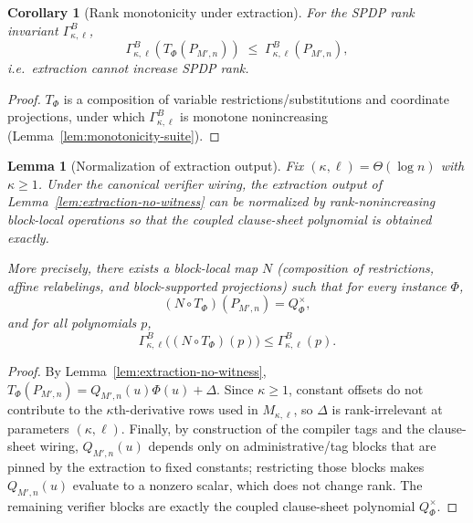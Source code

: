 \documentclass[12pt]{article}
\newtheorem{lemma}[theorem]{Lemma}
\newtheorem{corollary}[theorem]{Corollary}
\theoremstyle{definition}
\theoremstyle{definition}
\theoremstyle{remark}
\theoremstyle{remark}
\begin{document}
\begin{corollary}[Rank monotonicity under extraction]
\label{cor:rank-monotone-extraction}
For the SPDP rank invariant $\Gamma^{B}_{\kappa,\ell}$,
\[
\Gamma^{B}_{\kappa,\ell}\!\left(T_{\Phi}(P_{M',n})\right)
\;\le\;
\Gamma^{B}_{\kappa,\ell}(P_{M',n}),
\]
i.e.\ extraction cannot increase SPDP rank.
\end{corollary}

\begin{proof}
$T_{\Phi}$ is a composition of variable restrictions/substitutions and coordinate
projections, under which $\Gamma^{B}_{\kappa,\ell}$ is monotone nonincreasing
(Lemma~\ref{lem:monotonicity-suite}).
\end{proof}

\begin{lemma}[Normalization of extraction output]
\label{lem:extraction-normalization}
Fix $(\kappa,\ell)=\Theta(\log n)$ with $\kappa\ge 1$. Under the canonical verifier wiring,
the extraction output of Lemma~\ref{lem:extraction-no-witness} can be normalized
by rank-nonincreasing block-local operations so that the coupled clause-sheet polynomial
is obtained exactly.

More precisely, there exists a block-local map $N$ (composition of restrictions,
affine relabelings, and block-supported projections) such that for every instance $\Phi$,
\[
(N\circ T_\Phi)(P_{M',n}) = Q^{\times}_\Phi,
\]
and for all polynomials $p$,
\[
\Gamma^{B}_{\kappa,\ell}\big((N\circ T_\Phi)(p)\big)\le \Gamma^{B}_{\kappa,\ell}(p).
\]
\end{lemma}

\begin{proof}
By Lemma~\ref{lem:extraction-no-witness}, $T_\Phi(P_{M',n})=Q_{M',n}(u)\Phi(u)+\Delta$.
Since $\kappa\ge 1$, constant offsets do not contribute to the $\kappa$th-derivative rows used in
$M_{\kappa,\ell}$, so $\Delta$ is rank-irrelevant at parameters $(\kappa,\ell)$.
Finally, by construction of the compiler tags and the clause-sheet wiring,
$Q_{M',n}(u)$ depends only on administrative/tag blocks that are pinned by the extraction
to fixed constants; restricting those blocks makes $Q_{M',n}(u)$ evaluate to a nonzero
scalar, which does not change rank. The remaining verifier blocks are exactly the
coupled clause-sheet polynomial $Q^{\times}_\Phi$.
\end{proof}

\end{document}
